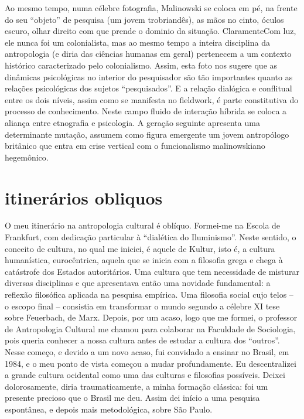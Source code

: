 \documentclass[a4paper, 12pt]{article} %
\begin{document}
Ao mesmo tempo, numa célebre fotografia, Malinowski se coloca em pé, na frente do seu “objeto” de pesquisa (um jovem trobriandês), as mãos no cinto, óculos escuro, olhar direito com que prende o dominio da situação. ClaramenteCom luz, ele nunca foi um colonialista, mas ao mesmo tempo a inteira disciplina da antropologia (e diria das ciências humanas em geral) pertenecem a um contexto histórico caracterizado pelo colonialismo. Assim, esta foto nos sugere que as dinâmicas psicológicas no interior do pesquisador são tão importantes  quanto as relações psicológicas dos sujetos “pesquisados”. E a relação dialógica e conflitual entre os dois níveis, assim como se manifesta no fieldwork, é  parte constitutiva do processo de conhecimento. Neste campo fluido de interação híbrida se coloca a aliança entre etnografia e psicologia. A geração seguinte apresenta uma determinante mutação, assumem como figura emergente um jovem antropólogo britânico que entra em crise vertical com o funcionalismo malinowskiano hegemônico.

\section*{itinerários obliquos}\label{sec:itine}
 O meu itinerário na antropologia cultural é oblíquo. Formei-me na Escola de Frankfurt, com dedicação particular à “dialética do Iluminismo”. Neste sentido, o conceito de cultura, no qual me iniciei, é aquele de Kultur, isto é, a cultura humanística, eurocêntrica, aquela que se inicia com a filosofia grega e chega à catástrofe dos Estados autoritários. Uma cultura que tem necessidade de misturar diversas disciplinas e que apresentava então uma novidade fundamental: a reflexão filosófica aplicada na pesquisa empírica. Uma filosofia social cujo telos – o escopo final – consistia em transformar o mundo segundo a célebre XI tese sobre Feuerbach, de Marx. Depois, por um acaso, logo que me formei, o professor de Antropologia Cultural me chamou para colaborar na Faculdade de Sociologia, pois queria conhecer a nossa cultura antes de estudar a cultura dos “outros”. Nesse começo, e devido a um novo acaso, fui convidado a ensinar no Brasil, em 1984, e o meu ponto de vista começou a mudar profundamente. Eu descentralizei a grande cultura ocidental como uma das culturas e filosofias possíveis. Deixei dolorosamente, diria traumaticamente, a minha formação clássica: foi um presente precioso que o Brasil me deu. Assim dei início a uma pesquisa espontânea, e depois mais metodológica, sobre São Paulo. 
\end{document}
